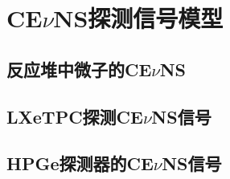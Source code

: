 
\chapter{CE$\nu$NS探测信号模型}

\section{反应堆中微子的CE$\nu$NS}

\section{LXeTPC探测CE$\nu$NS信号}
\label{sec:lxe_signal}

\section{HPGe探测器的CE$\nu$NS信号}

